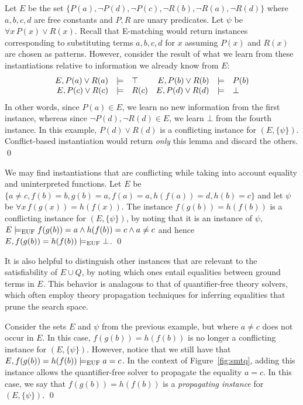 \documentclass[oribibl]{llncs}
\begin{document}
\begin{example}
Let $E$ be the set $\{ P(a), \neg P(d), \neg P( c ), \neg R(b), \neg R(a), \neg R(d) \}$ where $a,b,c,d$ are free constants and $P,R$ are unary predicates.
Let $\psi$ be $\forall x\, P( x ) \vee R( x )$.
Recall that E-matching would return instances corresponding to substituting terms $a,b,c,d$ for $x$
assuming $P( x )$ and $R( x )$ are chosen as patterns.
However, consider the result of what we learn from these instantiations relative to information we already know from $E$:
\[
\begin{array}{rcl@{\hspace{1em}}rcl}
E, P( a ) \vee R( a ) &\models& \top &
E, P( b ) \vee R( b ) &\models& P( b ) \\
E, P( c ) \vee R( c ) &\models& R( c ) &
E, P( d ) \vee R( d ) &\models& \bot \\
\end{array}
\]
In other words, since $P( a ) \in E$, we learn no new information from the first instance,
whereas since $\neg P( d ), \neg R( d ) \in E$, we learn $\bot$ from the fourth instance.
In this example, $P( d ) \vee R( d )$ is a conflicting instance for $( E, \{ \psi \} )$.
Conflict-based instantiation would return \emph{only} this lemma and discard the others.
\qed
\end{example}
\begin{example}
We may find instantiations that are conflicting while taking into account equality and uninterpreted functions.
Let $E$ be $\{ a \neq c, f( b ) = b, g( b ) = a, f( a ) = a, h( f( a ) ) = d, h( b ) =c \}$ and let $\psi$ be
$\forall x\, f( g( x ) ) = h( f( x ) )$. 
The instance $f( g( b ) ) = h( f( b ) )$ is a conflicting instance for $( E, \{ \psi \} )$,
by noting that it is an instance of $\psi$,
$E \models_\mathrm{EUF} f( g( b ) ) = a \wedge h( f( b ) ) = c \wedge a \neq c$
and hence $E, f( g( b ) ) = h( f( b ) ) \models_\mathrm{EUF} \bot$.
\qed
\end{example}
It is also helpful to distinguish other instances that are relevant to the satisfiability of $E \cup Q$,
by noting which ones entail equalities between ground terms in $E$.
This behavior is analagous to that of quantifier-free theory solvers, which often employ
theory propagation techniques for inferring equalities that prune the search space.
\begin{example}
Consider the sets $E$ and $\psi$ from the previous example, but where $a \neq c$ does not occur in $E$.
In this case, $f( g( b ) ) = h( f( b ) )$ is no longer a conflicting instance for $( E, \{ \psi \} )$.
However, notice that we still have that $E, f( g( b ) ) = h( f( b ) ) \models_\mathrm{EUF} a = c$.
In the context of Figure~\ref{fig:smtq}, 
adding this instance allows the quantifier-free solver to propagate the equality $a = c$.
In this case, we say that $f( g( b ) ) = h( f( b ) )$ is a \emph{propagating instance} for $( E, \{ \psi \} )$.
\qed
\end{example}
\end{document}
